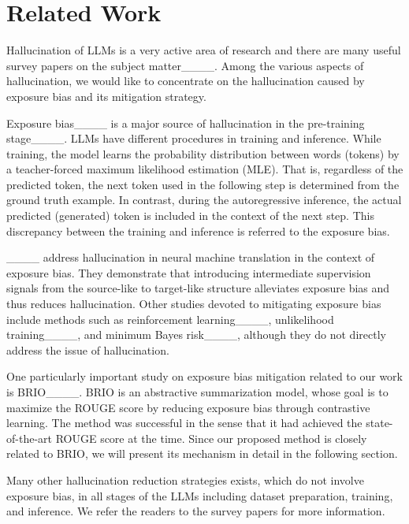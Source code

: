 \section{Related Work}
Hallucination of LLMs is a very active area of research and there are many useful survey papers on the subject matter____.
Among the various aspects of hallucination, we would like to concentrate on the hallucination caused by exposure bias and its mitigation strategy.

Exposure bias____ is a major source of hallucination in the pre-training stage____. 
LLMs have different procedures in training and inference. 
While training, the model learns the probability distribution between words (tokens) by a teacher-forced maximum likelihood estimation (MLE).
That is, regardless of the predicted token, the next token used in the following step is determined from the ground truth example. 
In contrast, during the autoregressive inference, the actual predicted (generated) token is included in the context of the next step.
This discrepancy between the training and inference is referred to the exposure bias. 

____ address hallucination in neural machine translation in the context of exposure bias. 
They demonstrate that introducing intermediate supervision signals from the source-like to target-like structure alleviates exposure bias and thus reduces hallucination. 
Other studies devoted to mitigating exposure bias include methods such as reinforcement learning____, unlikelihood training____, and minimum Bayes risk____, although they do not directly address the issue of hallucination.

One particularly important study on exposure bias mitigation related to our work is BRIO____.
BRIO is an abstractive summarization model, whose goal is to maximize the ROUGE score by reducing exposure bias through contrastive learning.
The method was successful in the sense that it had achieved the state-of-the-art ROUGE score at the time. 
Since our proposed method is closely related to BRIO, we will present its mechanism in detail in the following section. 

Many other hallucination reduction strategies exists, which do not involve exposure bias, in all stages of the LLMs including dataset preparation, training, and inference.
We refer the readers to the survey papers for more information.